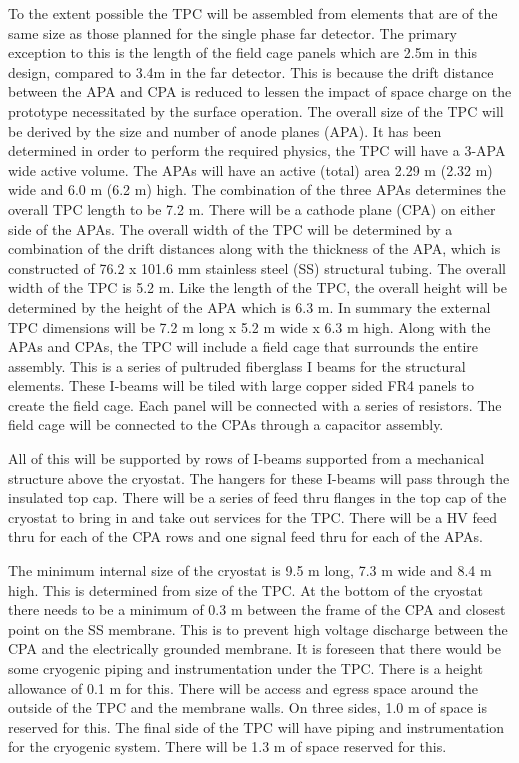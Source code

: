 To the extent possible the TPC will be assembled from elements that are of the same size as those planned for the single phase far detector.  The primary exception to this is the length of the field cage panels which are 2.5m in this design, compared to 3.4m in the far detector. This is because the drift distance between the APA and CPA is reduced to lessen the impact of space charge on the prototype necessitated by the surface operation. The overall size of the TPC will be derived by the size and number of anode planes (APA).  It has been determined in order to perform the required physics, the TPC will have a 3-APA wide active volume.  The APAs will have an active (total) area 2.29 m (2.32 m) wide and 6.0 m (6.2 m) high. The combination of the three APAs determines the overall TPC length to be 7.2 m. There will be a cathode plane (CPA) on either side of the APAs.  The overall width of the TPC will be determined by a combination of the drift distances along with the thickness of the APA, which is constructed of 76.2 x 101.6 mm stainless steel (SS) structural tubing.  The overall width of the TPC is 5.2 m.  Like the length of the TPC, the overall height will be determined by the height of the APA which is 6.3 m.  In summary the external TPC dimensions will be 7.2 m long x 5.2 m wide x 6.3 m high. Along with the APAs and CPAs, the TPC will include a field cage that surrounds the entire assembly.  This is a series of pultruded fiberglass I beams for the structural elements.  These I-beams will be tiled with large copper sided FR4 panels to create the field cage.  Each panel will be connected with a series of resistors.  The field cage will be connected to the CPAs through a capacitor assembly.

All of this will be supported by rows of I-beams supported from a mechanical structure above the cryostat.  The hangers for these I-beams will pass through the insulated top cap.  There will be a series of feed thru flanges in the top cap of the cryostat to bring in and take out services for the TPC.  There will be a HV feed thru for each of the CPA rows and one signal feed thru for each of the APAs.


The minimum internal size of the cryostat is 9.5 m long, 7.3 m wide and 8.4 m high.  This is determined from size of the TPC.  At the bottom of the 
cryostat there needs to be a minimum of 0.3 m between the frame of the CPA and closest point on the SS membrane.  This is to prevent high voltage discharge between the CPA and the electrically grounded membrane. It is foreseen that there would be some cryogenic piping and instrumentation under the TPC.  There is a height allowance of 0.1 m for this.  There will be access and egress space around the outside of the TPC and the membrane walls.  On three sides, 1.0 m of space is reserved for this.  The final side of the TPC will have piping and instrumentation for the cryogenic system.  There will be 1.3 m of space reserved for this.  

